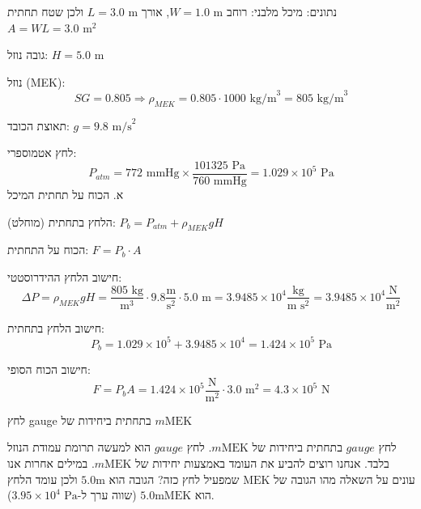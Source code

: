 \documentclass[
  hebrew,
  letterpaper,
  DIV=11,
  numbers=noendperiod]{scrreprt}
\begin{document}
\begin{tcolorbox}[enhanced jigsaw, colback=white, arc=.35mm, coltitle=black, breakable, toptitle=1mm, leftrule=.75mm, colbacktitle=quarto-callout-note-color!10!white, opacitybacktitle=0.6, bottomtitle=1mm, titlerule=0mm, opacityback=0, colframe=quarto-callout-note-color-frame, title=\textcolor{quarto-callout-note-color}{\faInfo}\hspace{0.5em}{פתרון סעיף א}, rightrule=.15mm, bottomrule=.15mm, toprule=.15mm, left=2mm]

נתונים: מיכל מלבני: רוחב \(W = 1.0 \text{ m}\), אורך
\(L = 3.0 \text{ m}\) ולכן שטח תחתית \(A = WL = 3.0 \text{ m}^2\)

גובה נוזל: \(H = 5.0 \text{ m}\)

נוזל (MEK):
\[SG = 0.805 \Rightarrow \rho_{MEK} = 0.805 \cdot 1000 \text{ kg/m}^3 = 805 \text{ kg/m}^3\]

תאוצת הכובד: \(g = 9.8 \text{ m/s}^2\)

לחץ אטמוספרי: \[
P_{atm} = 772 \text{ mmHg} \times \frac{101325 \text{ Pa}}{760 \text{ mmHg}} = 1.029 \times 10^5 \text{ Pa}
\] א. הכוח על תחתית המיכל

הלחץ בתחתית (מוחלט): \(P_b = P_{atm} + \rho_{MEK} g H\)

הכוח על התחתית: \(F = P_b \cdot A\)

חישוב הלחץ ההידרוסטטי: \[
\Delta P = \rho_{MEK} g H = \frac{805 \text{ kg}}{\text{m}^3} \cdot 9.8 \frac{\text{m}}{\text{s}^2} \cdot 5.0 \text{ m} = 3.9485 \times 10^4 \frac{\text{kg}}{\text{m s}^2} = 3.9485 \times 10^4 \frac{\text{N}}{\text{m}^2}
\]

חישוב הלחץ בתחתית: \[
P_b = 1.029 \times 10^5 + 3.9485 \times 10^4 = 1.424 \times 10^5 \text{ Pa}
\]

חישוב הכוח הסופי: \[
\boxed{F = P_b A = 1.424 \times 10^5 \frac{\text{N}}{\text{m}^2} \cdot 3.0 \text{ m}^2 = 4.3 \times 10^5 \text{ N}}
\]

\end{tcolorbox}

\begin{tcolorbox}[enhanced jigsaw, colback=white, arc=.35mm, coltitle=black, breakable, toptitle=1mm, leftrule=.75mm, colbacktitle=quarto-callout-note-color!10!white, opacitybacktitle=0.6, bottomtitle=1mm, titlerule=0mm, opacityback=0, colframe=quarto-callout-note-color-frame, title=\textcolor{quarto-callout-note-color}{\faInfo}\hspace{0.5em}{פתרון סעיף ב}, rightrule=.15mm, bottomrule=.15mm, toprule=.15mm, left=2mm]

לחץ gauge בתחתית ביחידות של \(m\text{MEK}\)

לחץ \(gauge\) בתחתית ביחידות של \(m\text{MEK}\). לחץ \(gauge\) הוא למעשה
תרומת עמודת הנוזל בלבד. אנחנו רוצים להביע את העומד באמצעות יחידות של
\(m\text{MEK}\). במילים אחרות אנו עונים על השאלה מהו הגובה של
\(\text{MEK}\) שמפעיל לחץ כזה? הגובה הוא \(5.0\text{m}\) ולכן עומד הלחץ
הוא \(5.0\text{mMEK}\) (שווה ערך ל-\(3.95 \times 10^4 \text{ Pa}\)).

\end{tcolorbox}
\end{document}

